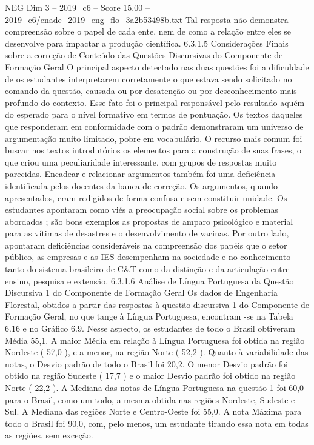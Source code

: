 \begin{textsample}{NEG Dim 3 – 2019\_c6 – Score 15.00 – 2019\_c6/enade\_2019\_eng\_flo\_3a2b53498b.txt}
Tal resposta não demonstra compreensão sobre o papel de cada ente, nem de como a relação entre eles se desenvolve para impactar a produção científica. 6.3.1.5 Considerações Finais sobre a correção de Conteúdo das Questões Discursivas do Componente de Formação Geral O principal aspecto detectado nas duas questões foi a dificuldade de os estudantes interpretarem corretamente o que estava sendo solicitado no comando da questão, causada ou por desatenção ou por desconhecimento mais profundo do contexto.
Esse fato foi o principal responsável pelo resultado aquém do esperado para o nível formativo em termos de pontuação.
Os textos daqueles que responderam em conformidade com o padrão demonstraram um universo de argumentação muito limitado, pobre em vocabulário.
O recurso mais comum foi buscar nos textos introdutórios os elementos para a construção de suas frases, o que criou uma peculiaridade interessante, com grupos de respostas muito parecidas.
Encadear e relacionar argumentos também foi uma deficiência identificada pelos docentes da banca de correção.
Os argumentos, quando apresentados, eram redigidos de forma confusa e sem constituir unidade.
Os estudantes apontaram como viés a preocupação social sobre os problemas abordados ; são bons exemplos as propostas de amparo psicológico e material para as vítimas de desastres e o desenvolvimento de vacinas.
Por outro lado, apontaram deficiências consideráveis na compreensão dos papéis que o setor público, as empresas e as IES desempenham na sociedade e no conhecimento tanto do sistema brasileiro de C\&T como da distinção e da articulação entre ensino, pesquisa e extensão. 6.3.1.6 Análise de Língua Portuguesa da Questão Discursiva 1 do Componente de Formação Geral Os dados de Engenharia Florestal, obtidos a partir das respostas à questão discursiva 1 do Componente de Formação Geral, no que tange à Língua Portuguesa, encontram -se na Tabela 6.16 e no Gráfico 6.9.
Nesse aspecto, os estudantes de todo o Brasil obtiveram Média 55,1.
A maior Média em relação à Língua Portuguesa foi obtida na região Nordeste ( 57,0 ), e a menor, na região Norte ( 52,2 ).
Quanto à variabilidade das notas, o Desvio padrão de todo o Brasil foi 20,2.
O menor Desvio padrão foi obtido na região Sudeste ( 17,7 ) e o maior Desvio padrão foi obtido na região Norte ( 22,2 ).
A Mediana das notas de Língua Portuguesa na questão 1 foi 60,0 para o Brasil, como um todo, a mesma obtida nas regiões Nordeste, Sudeste e Sul.
A Mediana das regiões Norte e Centro-Oeste foi 55,0.
A nota Máxima para todo o Brasil foi 90,0, com, pelo menos, um estudante tirando essa nota em todas as regiões, sem exceção.

\end{textsample}
